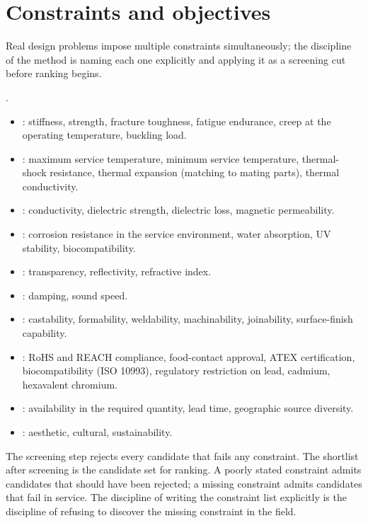 \section{Constraints and objectives}

Real design problems impose multiple constraints simultaneously; the
discipline of the method is naming each one explicitly and applying
it as a screening cut before ranking begins.

.

\begin{itemize}[leftmargin=*]
\item {}: stiffness, strength, fracture toughness,
  fatigue endurance, creep at the operating temperature, buckling
  load.
\item {}: maximum service temperature, minimum service
  temperature, thermal-shock resistance, thermal expansion (matching
  to mating parts), thermal conductivity.
\item {}: conductivity,
  dielectric strength, dielectric loss, magnetic permeability.
\item {}: corrosion resistance in
  the service environment, water absorption, UV stability,
  biocompatibility.
\item {}: transparency, reflectivity, refractive index.
\item {}: damping, sound speed.
\item {}: castability, formability, weldability,
  machinability, joinability, surface-finish capability.
\item {}: RoHS and REACH compliance, food-contact
  approval, ATEX certification, biocompatibility (ISO 10993),
  regulatory restriction on lead, cadmium, hexavalent chromium.
\item {}: availability in the required quantity,
  lead time, geographic source diversity.
\item {}: aesthetic, cultural, sustainability.
\end{itemize}

The screening step rejects every candidate that fails any constraint.
The shortlist after screening is the candidate set for ranking. A
poorly stated constraint admits candidates that should have been
rejected; a missing constraint admits candidates that fail in service.
The discipline of writing the constraint list explicitly is the
discipline of refusing to discover the missing constraint in the
field.

